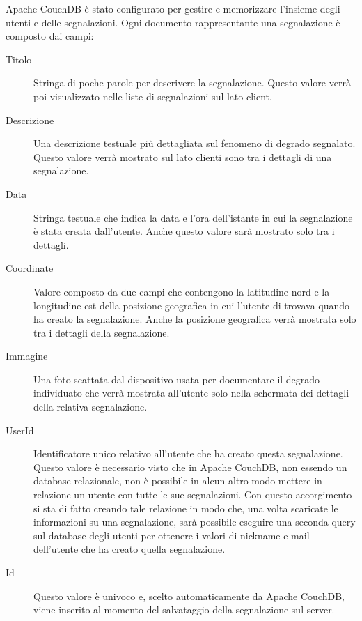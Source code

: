 		Apache CouchDB\texttrademark{} è stato configurato per gestire e
		memorizzare l'insieme degli utenti e delle segnalazioni.
		Ogni documento rappresentante una segnalazione è composto dai campi:
		\begin{description}
			\item[Titolo] Stringa di poche parole per descrivere la segnalazione.
				Questo valore verrà poi visualizzato nelle liste di segnalazioni
				sul lato client.
			\item[Descrizione] Una descrizione testuale più dettagliata sul
				fenomeno di degrado segnalato. Questo valore verrà mostrato sul
				lato clienti sono tra i dettagli di una segnalazione.
			\item[Data] Stringa testuale che indica la data e l'ora dell'istante
				in cui la segnalazione è stata creata dall'utente. Anche questo
				valore sarà mostrato solo tra i dettagli.
			\item[Coordinate] Valore composto da due campi che contengono la
				latitudine nord e la longitudine est della posizione geografica
				in cui l'utente di trovava quando ha creato la segnalazione. Anche
				la posizione geografica verrà mostrata solo tra i dettagli della
				segnalazione.
			\item[Immagine] Una foto scattata dal dispositivo usata	per
				documentare il degrado individuato che verrà mostrata all'utente
				solo nella schermata dei dettagli della relativa segnalazione.
			\item[UserId] Identificatore unico relativo all'utente che ha creato
				questa segnalazione. Questo valore è necessario visto che in
				Apache CouchDB\texttrademark{}, non essendo un database relazionale,
				non è possibile in alcun altro modo mettere in relazione un utente con
				tutte le sue segnalazioni. Con questo accorgimento si sta di fatto
				creando tale relazione in modo che, una volta scaricate le
				informazioni su una segnalazione, sarà possibile eseguire una
				seconda query sul database degli utenti per ottenere i valori
				di nickname e mail dell'utente che ha creato quella segnalazione.
			\item[Id] Questo valore è univoco e, scelto automaticamente da
				Apache CouchDB\texttrademark{}, viene inserito al momento del
				salvataggio della segnalazione sul server.
		\end{description}
		
